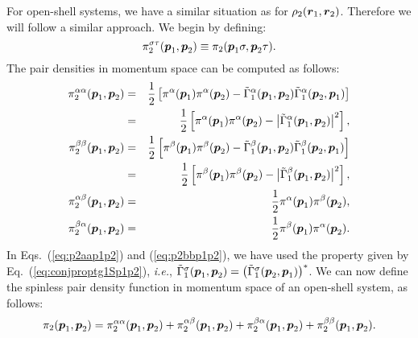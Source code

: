 For open-shell systems, we have a similar situation as for $\rho_2(\boldsymbol{r}_1,\boldsymbol{r}_2)$. Therefore
we will follow a similar approach. We begin by defining:
%
\begin{equation}
   \pi_2^{\sigma\tau}(\boldsymbol{p}_1,\boldsymbol{p}_2)\equiv\pi_2(\boldsymbol{p}_1\sigma,\boldsymbol{p}_2\tau).
\end{equation}
%
The pair densities in momentum space can be computed as follows:
%
\begin{eqnarray}
	\pi_2^{\alpha\alpha}(\boldsymbol{p}_1,\boldsymbol{p}_2) & = & \frac{1}{2}\left[\pi^{\alpha}(\boldsymbol{p}_1)\pi^{\alpha}(\boldsymbol{p}_2)
	-\tilde\Gamma_1^{\alpha}(\boldsymbol{p}_1,\boldsymbol{p}_2)\tilde\Gamma_1^{\alpha}(\boldsymbol{p}_2,\boldsymbol{p}_1)\right]\nonumber\\
	                                   & = & \frac{1}{2}\left[\pi^{\alpha}(\boldsymbol{p}_1)\pi^{\alpha}(\boldsymbol{p}_2)
	-\big|\tilde\Gamma_1^{\alpha}(\boldsymbol{p}_1,\boldsymbol{p}_2)\big|^2\right],\label{eq:p2aap1p2}\\
	\pi_2^{\beta\beta}(\boldsymbol{p}_1,\boldsymbol{p}_2) & = & \frac{1}{2}\left[\pi^{\beta}(\boldsymbol{p}_1)\pi^{\beta}(\boldsymbol{p}_2)
	-\tilde\Gamma_1^{\beta}(\boldsymbol{p}_1,\boldsymbol{p}_2)\tilde\Gamma_1^{\beta}(\boldsymbol{p}_2,\boldsymbol{p}_1)\right]\nonumber\\
	                                 & = & \frac{1}{2}\left[\pi^{\beta}(\boldsymbol{p}_1)\pi^{\beta}(\boldsymbol{p}_2)
	-\big|\tilde\Gamma_1^{\beta}(\boldsymbol{p}_1,\boldsymbol{p}_2)\big|^2\right],\label{eq:p2bbp1p2}\\
	\pi_2^{\alpha\beta}(\boldsymbol{p}_1,\boldsymbol{p}_2) & = & \frac{1}{2}\pi^{\alpha}(\boldsymbol{p}_1)\pi^{\beta}(\boldsymbol{p}_2),\label{eq:p2abp1p2}\\
	\pi_2^{\beta\alpha}(\boldsymbol{p}_1,\boldsymbol{p}_2) & = & \frac{1}{2}\pi^{\beta}(\boldsymbol{p}_1)\pi^{\alpha}(\boldsymbol{p}_2).\label{eq:p2bap1p2}
\end{eqnarray}
%
In Eqs.~(\ref{eq:p2aap1p2}) and (\ref{eq:p2bbp1p2}), we have used the property
given by Eq.~(\ref{eq:conjproptg1Sp1p2}), \textit{i.e.},
$\tilde\Gamma_1^{\sigma}(\boldsymbol{p}_1,\boldsymbol{p}_2)=\big(\tilde\Gamma_1^{\sigma}(\boldsymbol{p}_2,\boldsymbol{p}_1)\big)^*$.
%
We can now define the spinless pair density function in momentum space of an open-shell system,
as follows:
\begin{equation}
	\pi_2(\boldsymbol{p}_1,\boldsymbol{p}_2)=\pi_2^{\alpha\alpha}(\boldsymbol{p}_1,\boldsymbol{p}_2)+\pi_2^{\alpha\beta}(\boldsymbol{p}_1,\boldsymbol{p}_2)
	+\pi_2^{\beta\alpha}(\boldsymbol{p}_1,\boldsymbol{p}_2)+\pi_2^{\beta\beta}(\boldsymbol{p}_1,\boldsymbol{p}_2).
\end{equation}
%



